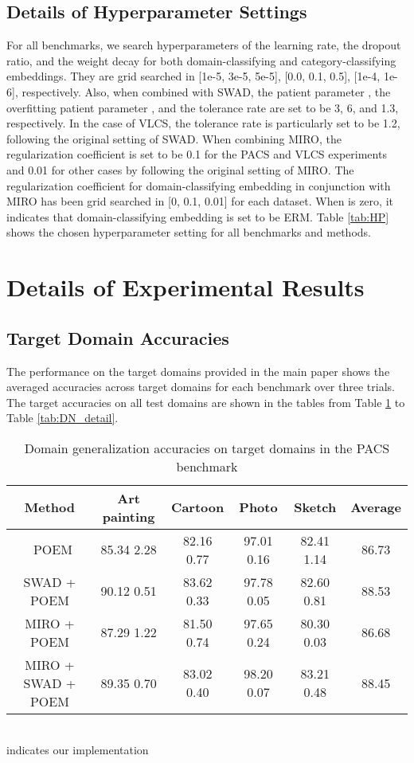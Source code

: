 \documentclass[letterpaper]{article} \usepackage{aaai23}  \usepackage{times}  \usepackage{helvet}  \usepackage{courier}  \usepackage[hyphens]{url}  \usepackage{graphicx} \urlstyle{rm} \def\UrlFont{\rm}  \usepackage{natbib}  \usepackage{caption} \frenchspacing  \setlength{\pdfpagewidth}{8.5in}  \setlength{\pdfpageheight}{11in}  \usepackage[labelsep=period]{caption}
\begin{document}
\subsection{Details of Hyperparameter Settings}
For all benchmarks, we search hyperparameters of the learning rate, the dropout ratio, and the weight decay for both domain-classifying and category-classifying embeddings. They are grid searched in [1e-5, 3e-5, 5e-5], [0.0, 0.1, 0.5], [1e-4, 1e-6], respectively. 
Also, when combined with SWAD, the patient parameter , the overfitting patient parameter , and the tolerance rate  are set to be 3, 6, and 1.3, respectively. In the case of VLCS, the tolerance rate  is particularly set to be 1.2, following the original setting of SWAD. 
When combining MIRO, the regularization coefficient  is set to be 0.1 for the PACS and VLCS experiments and 0.01 for other cases by following the original setting of MIRO. 
The regularization coefficient for domain-classifying embedding in conjunction with MIRO has been grid searched in [0, 0.1, 0.01] for each dataset. 
When  is zero, it indicates that domain-classifying embedding is set to be ERM. Table \ref{tab:HP} shows the chosen hyperparameter setting for all benchmarks and methods.

\section{Details of Experimental Results}
\subsection{Target Domain Accuracies}
The performance on the target domains provided in the main paper shows the averaged accuracies across target domains for each benchmark over three trials. 
The target accuracies on all test domains are shown in the tables from Table \ref{tab:PACS_detail} to Table \ref{tab:DN_detail}.

\begin{table}[H]
\centering
	\begin{tabular}{ccccc|c}
		\toprule
		\textbf{Method} & Art painting & Cartoon & Photo & Sketch & Average\\
		\midrule\
		POEM & 85.34  2.28 & 82.16  0.77 & 97.01  0.16 & 82.41  1.14 & 86.73 \\
		SWAD + POEM & 90.12  0.51 & 83.62  0.33 & 97.78  0.05 & 82.60  0.81 & 88.53 \\
		MIRO + POEM& 87.29  1.22 & 81.50  0.74 & 97.65  0.24 & 80.30  0.03 & 86.68 \\
		MIRO + SWAD + POEM& 89.35  0.70 & 83.02  0.40 & 98.20  0.07 & 83.21  0.48 & 88.45 \\
		\hline
	\end{tabular}
	\footnotesize{\\ indicates our implementation}\\
        \caption{Domain generalization accuracies on target domains in the PACS benchmark}
        \label{tab:PACS_detail}
\end{table}	
\end{document}
